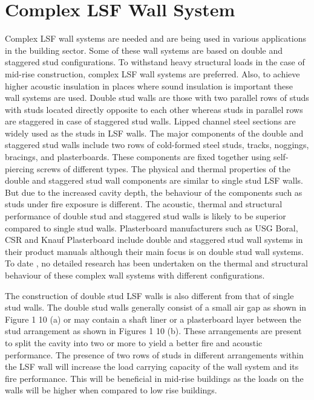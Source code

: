 \section{Complex LSF Wall System}
Complex LSF wall systems are needed and are being used in various applications in the building sector. Some of these wall systems are based on double and staggered stud configurations. To withstand heavy structural loads in the case of mid-rise construction, complex LSF wall systems are preferred. Also, to achieve higher acoustic insulation in places where sound insulation is important these wall systems are used. Double stud walls are those with two parallel rows of studs with studs located directly opposite to each other whereas studs in parallel rows are staggered in case of staggered stud walls. Lipped channel steel sections are widely used as the studs in LSF walls. The major components of the double and staggered stud walls include two rows of cold-formed steel studs, tracks, noggings, bracings, and plasterboards. These components are fixed together using self-piercing screws of different types. The physical and thermal properties of the double and staggered stud wall components are similar to single stud LSF walls. But due to the increased cavity depth, the behaviour of the components such as studs under fire exposure is different. The acoustic, thermal and structural performance of double stud and staggered stud walls is likely to be superior compared to single stud walls. Plasterboard manufacturers such as USG Boral, CSR and Knauf Plasterboard include double and staggered stud wall systems in their product manuals although their main focus is on double stud wall systems. To date , no detailed research has been undertaken on the thermal and structural behaviour of these complex wall systems with different configurations. 

The construction of double stud LSF walls is also different from that of single stud walls. The double stud walls generally consist of a small air gap as shown in Figure 1 10 (a) or may contain a shaft liner or a plasterboard layer between the stud arrangement as shown in Figures 1 10 (b). These arrangements are present to split the cavity into two or more to yield a better fire and acoustic performance. The presence of two rows of studs in different arrangements within the LSF wall will increase the load carrying capacity of the wall system and its fire performance. This will be beneficial in mid-rise buildings as the loads on the walls will be higher when compared to low rise buildings.

